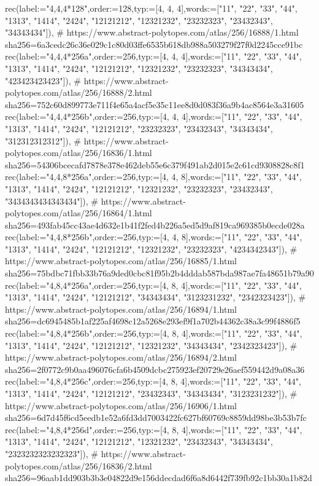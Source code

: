 \documentclass[11pt,a4paper]{article}
\begin{document}
\begin{CompleteProgram}
rec(label:="{4,4,4}*128",order:=128,typ:=[4, 4, 4],words:=["11", "22", "33", "44", "1313", "1414", "2424", "12121212", "12321232", "23232323", "23432343", "34343434"]),
# https://www.abstract-polytopes.com/atlas/256/16888/1.html sha256=6a3cedc26c36e029c1c80d03ffe6535b618db988a503279f27f0d2245cce91bc
rec(label:="{4,4,4}*256a",order:=256,typ:=[4, 4, 4],words:=["11", "22", "33", "44", "1313", "1414", "2424", "12121212", "12321232", "23232323", "34343434", "423423423423"]),
# https://www.abstract-polytopes.com/atlas/256/16888/2.html sha256=752c60d899773e711f4e65a4acf5e35c11ee8d0d083f36a9b4ac8564e3a31605
rec(label:="{4,4,4}*256b",order:=256,typ:=[4, 4, 4],words:=["11", "22", "33", "44", "1313", "1414", "2424", "12121212", "23232323", "23432343", "34343434", "312312312312"]),
# https://www.abstract-polytopes.com/atlas/256/16836/1.html sha256=54306bcecafd7878e378e462deb55e6c379f491ab2d015e2c61cd9308828c8f1
rec(label:="{4,4,8}*256a",order:=256,typ:=[4, 4, 8],words:=["11", "22", "33", "44", "1313", "1414", "2424", "12121212", "12321232", "23232323", "23432343", "3434343434343434"]),
# https://www.abstract-polytopes.com/atlas/256/16864/1.html sha256=493fab45cc43ae4d632e1b41f2fed4b226a5ed5d9af819ca969385b0ecde028a
rec(label:="{4,4,8}*256b",order:=256,typ:=[4, 4, 8],words:=["11", "22", "33", "44", "1313", "1414", "2424", "12121212", "12321232", "23232323", "4234342343"]),
# https://www.abstract-polytopes.com/atlas/256/16885/1.html sha256=75bdbc71fbb33b76a9ded0cbc81f95b2b4dddab587bda987ae7fa48651b79a90
rec(label:="{4,8,4}*256a",order:=256,typ:=[4, 8, 4],words:=["11", "22", "33", "44", "1313", "1414", "2424", "12121212", "34343434", "3123231232", "2342323423"]),
# https://www.abstract-polytopes.com/atlas/256/16894/1.html sha256=dc6945485b1af225af4698c12a5268e293ef9f1a702b44362c38a3c99f4886f5
rec(label:="{4,8,4}*256b",order:=256,typ:=[4, 8, 4],words:=["11", "22", "33", "44", "1313", "1414", "2424", "12121212", "12321232", "34343434", "2342323423"]),
# https://www.abstract-polytopes.com/atlas/256/16894/2.html sha256=2f0772c9b0aa496076cfa6b4509dcbc275923ef20729e26aef559442d9a08a36
rec(label:="{4,8,4}*256c",order:=256,typ:=[4, 8, 4],words:=["11", "22", "33", "44", "1313", "1414", "2424", "12121212", "23432343", "34343434", "3123231232"]),
# https://www.abstract-polytopes.com/atlas/256/16906/1.html sha256=6d7d45f6cd5eedb1e52a6fd3dd7003422fc627bf60769c8859dd98be3b53b7fc
rec(label:="{4,8,4}*256d",order:=256,typ:=[4, 8, 4],words:=["11", "22", "33", "44", "1313", "1414", "2424", "12121212", "12321232", "23432343", "34343434", "2323232323232323"]),
# https://www.abstract-polytopes.com/atlas/256/16836/2.html sha256=96aab1dd903b3b3e04822d9e156ddecdad6f6a8d6442f739fb92c1bb30a1b82d

\end{CompleteProgram}
\end{document}
